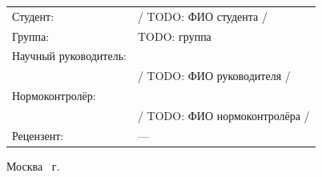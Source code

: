 \vspace{14mm}

\begin{flushleft}
{\fontsize{12pt}{14pt}\selectfont
\begin{tabular}{@{}p{55mm}p{107mm}@{}}
Студент: & \underline{\hspace{55mm}} / TODO: ФИО студента / \\[8pt]
Группа: & TODO: группа \\[8pt]
Научный руководитель: & \underline{\hspace{55mm}} \\
& / TODO: ФИО руководителя / \\[8pt]
Нормоконтролёр: & \underline{\hspace{55mm}} \\
& / TODO: ФИО нормоконтролёра / \\[8pt]
Рецензент: & --- \\
\end{tabular}
}
\end{flushleft}

\vfill

\begin{center}
{\fontsize{12pt}{14pt}\selectfont
Москва \the\year\ г.
}
\end{center}

\newpage
